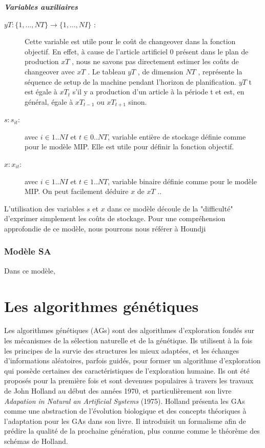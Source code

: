 \documentclass[12pt,a4paper]{article}
\begin{document}
		\textsl{\textbf{Variables auxiliaires}} \\
		\begin{description}
			\item[$yT : \{1, ..., NT\} \rightarrow \{1, ..., NI\}$ :] Cette variable est utile pour le coût de changeover dans la fonction objectif. En effet, à cause de l’article artificiel 0 présent dans le plan de production $xT$ , nous ne savons pas directement estimer les coûts de changeover avec $xT$ . Le tableau $yT$ , de dimension $NT$ , représente la séquence de setup de la machine pendant l’horizon de planification. $yT$ t est égale à $xT_{t}$ s’il y a production d’un article à la période t et est, en général, égale à $xT_{t-1}$ ou $xT_{t+1}$ sinon.
			\item[$s : s_{it}$:] avec $i \in {1..NI}$ et $t \in {0..NT}$, variable entière de stockage
définie comme pour le modèle MIP. Elle est utile pour définir la fonction objectif.
			\item[$x : x_{it}$:] avec $i \in {1..N I}$ et $t \in {1..N T}$, variable binaire définie comme pour le modèle MIP. On peut facilement déduire $x$ de $xT$ ..
		\end{description}
		\hspace*{.5cm} L’utilisation des variables $s$ et $x$ dans ce modèle découle de la "difficulté" d’exprimer simplement les coûts de stockage. Pour une compréhension approfondie de ce modèle, nous pourrons nous référer à Houndji \cite{houndji}
	
		\subsubsection{Modèle SA}
		Dans ce modèle, 
		
	\section{Les algorithmes génétiques}
		
	Les algorithmes génétiques (AGs) sont des algorithmes d’exploration fondés sur les mécanismes de la sélection naturelle et de la génétique. Ils utilisent à la fois les principes de la survie des structures les mieux adaptées, et les échanges d’informations aléatoires, parfois guidés, pour former un algorithme d’exploration qui possède certaines des caractéristiques de l’exploration humaine. Ils ont été proposés pour la première fois et sont devenues populaires à travers les travaux de John Holland au début des années 1970, et particulièrement son livre \emph{Adapation in Natural an Artificial Systems} (1975). Holland présenta les GAs comme une abstraction de l'évolution biologique et des concepts théoriques à l'adaptation pour les GAs dans son livre. Il introduisit un formalisme afin de prédire la qualité de la prochaine génération, plus connue comme le théorème des schémas de Holland.
	
\end{document}
